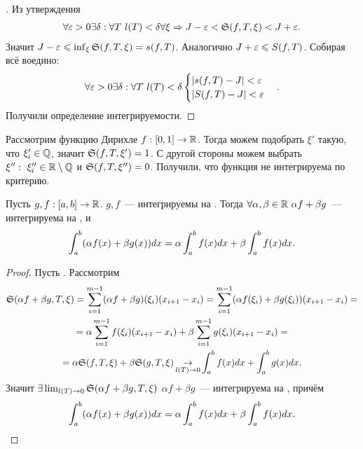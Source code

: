 \documentclass[../main.tex]{subfiles}
\begin{document}
\begin{proof}[\circled{\lhence}]
    Из утверждения 
    \begin{gather*}
        \forall \varepsilon > 0 \exists \delta : \forall T\ l(T) < \delta \forall \xi \Rightarrow J - \varepsilon < \mathfrak{S} (f, T, \xi) < J + \varepsilon.
    \end{gather*}
    Значит $J - \varepsilon \leqslant \inf_\xi \mathfrak{S} (f, T, \xi) = s(f, T)$. Аналогично $J + \varepsilon \leqslant S(f, T)$.
    Собирая всё воедино:
    \begin{gather*}
        \forall \varepsilon > 0 \exists \delta : \forall T \ l(T) < \delta \begin{cases}|s(f,T) - J| < \varepsilon \\ |S(f,T) - J| < \varepsilon\end{cases}.
    \end{gather*}
    Получили определение интегрируемости.
\end{proof}

\begin{example}
    Рассмотрим функцию Дирихле $f:[0,1] \to \mathbb{R}$. Тогда можем подобрать $\xi'$ такую, что $\xi'_i \in \mathbb{Q}$, значит $\mathfrak{S}(f, T, \xi') = 1$. С другой стороны можем выбрать $\xi'':\ \xi''_i \in \mathbb{R} \setminus \mathbb{Q}$ и $\mathfrak{S}(f,T, \xi'') = 0$. Получили, что функция не интегрируема по критерию.
\end{example}

\begin{proposition}
    Пусть $g,f:[a,b] \to \mathbb{R}$. $g,f$~--- интегрируемы на \segab. Тогда $\forall \alpha, \beta \in \mathbb{R}\ \alpha f + \beta g$~--- интегрируема на \segab, и 
    \begin{gather*}
        \int_a^b (\alpha f(x) + \beta g(x)) dx = \alpha \int_a^b f(x) dx + \beta \int_a^b f(x) dx.
    \end{gather*}
\end{proposition}

\begin{proof}
    Пусть \tpab. Рассмотрим 
    \begin{multline*}
        \mathfrak{S}(\alpha f + \beta g, T, \xi) = \sum_{i=1}^{m-1}(\alpha f + \beta g)(\xi_i)(x_{i+1} - x_{i}) = \sum_{i=1}^{m-1}(\alpha f(\xi_i) + \beta g(\xi_i))(x_{i+1} - x_{i}) = \\ = \alpha \sum_{i=1}^{m-1}f(\xi_i)(x_{i+1} - x_i) + \beta \sum_{i=1}^{m-1}g(\xi_i)(x_{i+1} - x_i) = \\ = \alpha \mathfrak{S}(f,T,\xi) + \beta \mathfrak{S}(g,T,\xi) \operatorname*{\to}_{l(T) \to 0} \int_a^b f(x) dx + \int_a^b g(x) dx.
    \end{multline*}
    Значит $\exists \lim_{l(T) \to 0} \mathfrak{S}(\alpha f + \beta g, T, \xi)$ \hence $\alpha f + \beta  g$~--- интегрируема на \segab, причём 
    \begin{gather*}
        \int_a^b (\alpha f(x) + \beta g(x)) dx = \alpha \int_a^b f(x) dx + \beta \int_a^b f(x) dx.
    \end{gather*}
\end{proof}
\end{document}
